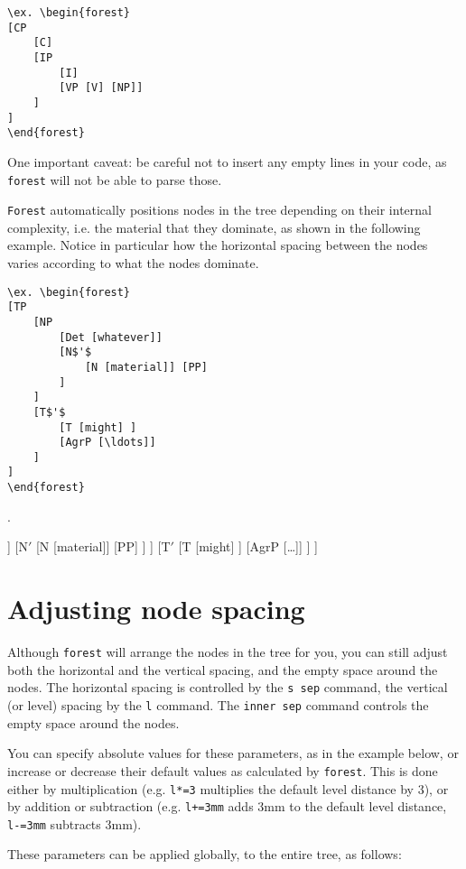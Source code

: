 \documentclass[12pt]{article}
\begin{document}
\begin{lstlisting}[basicstyle=\ttfamily,basewidth=0.5em]
\ex. \begin{forest}
[CP 
	[C] 
	[IP 
		[I]
		[VP [V] [NP]]
	] 
]
\end{forest}
\end{lstlisting}
One important caveat: be careful not to insert any empty lines in your code, as \texttt{forest} will not be able to parse those.

\texttt{Forest} automatically positions nodes in the tree depending on their internal complexity, i.e. the material that they dominate, as shown in the following example. Notice in particular how the horizontal spacing between the nodes varies according to what the nodes dominate.

\begin{lstlisting}[basicstyle=\ttfamily,basewidth=0.5em]
\ex. \begin{forest}
[TP
	[NP
		[Det [whatever]]
		[N$'$
			[N [material]] [PP]
		]
	] 
	[T$'$
		[T [might] ] 
		[AgrP [\ldots]] 
	]
]
\end{forest}
\end{lstlisting}

\ex. \begin{forest}
[TP
	[NP
		[Det [whatever]]
		[N$'$
			[N [material]] [PP]
		]
	] 
	[T$'$
		[T [might] ] 
		[AgrP [\ldots]] 
	]
]
\end{forest}


\section{Adjusting node spacing}

Although \texttt{forest} will arrange the nodes in the tree for you, you can still adjust both the horizontal and the vertical spacing, and the empty space around the nodes. The horizontal spacing is controlled by the \texttt{s sep} command, the vertical (or level) spacing by the \texttt{l} command. The \texttt{inner sep} command controls the empty space around the nodes. 

You can specify absolute values for these parameters, as in the example below, or increase or decrease their default values as calculated by \texttt{forest}. This is done either by multiplication (e.g. \texttt{l*=3} multiplies the default level distance by 3), or by addition or subtraction (e.g. \texttt{l+=3mm} adds 3mm to the default level distance, \texttt{l-=3mm} subtracts 3mm). 

These parameters can be applied globally, to the entire tree, as follows:
\end{document}

